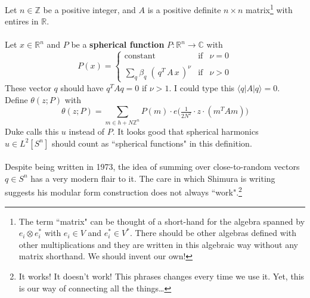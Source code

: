 \documentclass[12pt]{article}
\begin{document}
\newpage
\noindent Let $n \in \mathbb{Z}$ be a positive integer, and $A$ is a positive definite $n \times n$ matrix\footnote{The term ``matrix" can be thought of a short-hand for the algebra spanned by $e_i \otimes e_i^*$ with $e_i \in V$ and $e_i^* \in V^*$.  There should be other algebras defined with other multiplications and they are written in this algebraic way without any matrix shorthand.  We should invent our own!} with entires in $\mathbb{R}$.  \\ \\
Let $x \in \mathbb{R}^n$ and $P$ be a \textbf{spherical function} $P: \mathbb{R}^n \to \mathbb{C}$ with 
$$ P(x) = \left\{ \begin{array}{lcc} 
\text{constant} & \text{if} & \nu=0  \\ \\
\displaystyle \sum_q \beta_q \;( \, q^T \, A \, x \,)^\nu & \text{if} & \nu>0
\end{array} \right. $$
These vector $q$ should have $q^T A q = 0$ if $\nu > 1$. I could type this $\langle q | A | q \rangle = 0$. Define $\theta(z;P)$ with
$$ \theta(z;P) = \sum_{m \in h + N \mathbb{Z}^n} P(m) \cdot e 
\Big( \tfrac{1}{2N^2} \cdot z \cdot (m^T A m)  \Big) $$
Duke calls this $u$ instead of $P$.  It looks good that spherical harmonics $u \in L^2[S^n]$ should count as ``spherical functions" in this definition. \\ \\
Despite being written in 1973, the idea of summing over close-to-random vectors $q \in S^n $ has a very modern flair to it.  The care in which Shimura is writing suggests his modular form construction does not always ``work".\footnote{It works!  It doesn't work!  This phrases changes every time we use it.  Yet, this is our way of connecting all the things\dots}
\end{document}
